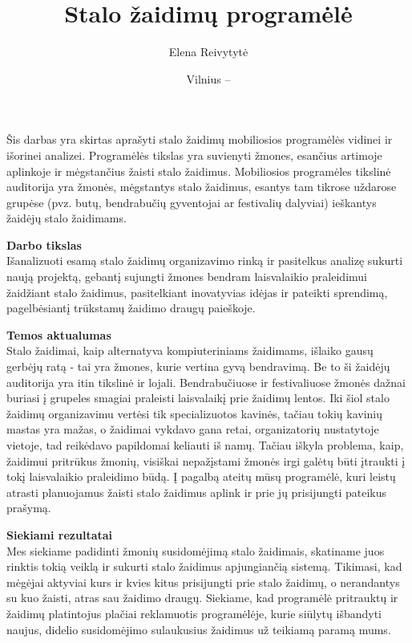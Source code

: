 \documentclass{VUMIFPSkursinis}
\title{Stalo žaidimų programėlė}
\author{Elena Reivytytė}
\date{Vilnius – \the\year}
\begin{document}
\maketitle

Šis darbas yra skirtas aprašyti stalo žaidimų mobiliosios programėlės vidinei ir išorinei analizei. 
Programėlės tikslas yra suvienyti žmones, esančius artimoje aplinkoje ir mėgstančius žaisti stalo žaidimus. 
Mobiliosios programėles tikslinė auditorija yra žmonės, mėgstantys stalo žaidimus, esantys tam 
tikrose uždarose grupėse (pvz. butų, bendrabučių gyventojai ar festivalių dalyviai) ieškantys žaidėjų stalo žaidimams. 

\tableofcontents

\textbf{Darbo tikslas}\\
Išanalizuoti esamą stalo žaidimų organizavimo rinką ir pasitelkus analizę sukurti naują projektą, 
gebantį sujungti žmones bendram laisvalaikio praleidimui žaidžiant stalo žaidimus, pasitelkiant 
inovatyvias idėjas ir pateikti sprendimą, pagelbėsiantį trūkstamų žaidimo draugų paieškoje.

\textbf{Temos aktualumas}\\
Stalo žaidimai, kaip alternatyva kompiuteriniams žaidimams, išlaiko gausų gerbėjų ratą - tai 
yra žmones, kurie vertina gyvą bendravimą. Be to ši žaidėjų auditorija yra itin tikslinė ir 
lojali. Bendrabučiuose ir festivaliuose žmonės dažnai buriasi į grupeles smagiai praleisti 
laisvalaikį prie žaidimų lentos. Iki šiol stalo žaidimų organizavimu vertėsi tik specializuotos 
kavinės, tačiau tokių kavinių mastas yra mažas, o žaidimai vykdavo gana retai, organizatorių 
nustatytoje vietoje, tad reikėdavo papildomai keliauti iš namų. Tačiau iškyla problema, kaip, 
žaidimui pritrūkus žmonių, visiškai nepažįstami žmonės irgi galėtų būti įtraukti į tokį laisvalaikio 
praleidimo būdą. Į pagalbą ateitų mūsų programėlė, kuri leistų atrasti planuojamus žaisti stalo 
žaidimus aplink ir prie jų prisijungti pateikus prašymą.

\textbf{Siekiami rezultatai}\\
Mes siekiame padidinti žmonių susidomėjimą stalo žaidimais, skatiname juos rinktis tokią veiklą 
ir sukurti stalo žaidimus apjungiančią sistemą. Tikimasi, kad mėgėjai aktyviai kurs ir kvies 
kitus prisijungti prie stalo žaidimų, o nerandantys su kuo žaisti, atras sau žaidimo draugų. 
Siekiame, kad programėlė pritrauktų ir žaidimų platintojus plačiai reklamuotis programėlėje, 
kurie siūlytų išbandyti naujus, didelio susidomėjimo sulaukusius žaidimus už teikiamą paramą mums.
\end{document}
